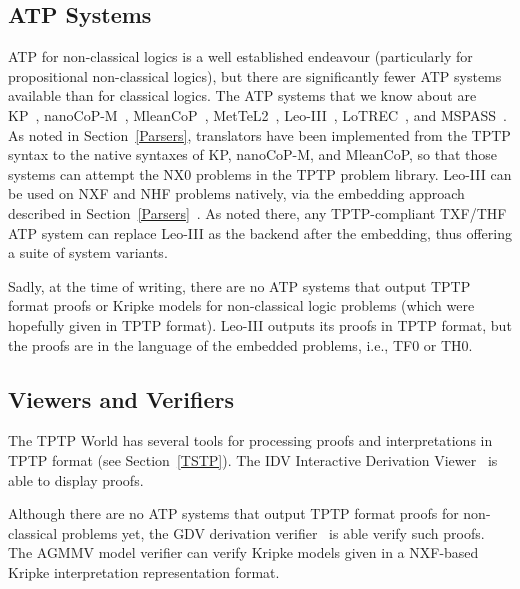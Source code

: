 \documentclass{ceurart}
\begin{document}
\subsection{ATP Systems}
\label{ATPSystems}

ATP for non-classical logics is a well established endeavour (particularly for propositional
non-classical logics), but there are significantly fewer ATP systems available than for classical 
logics.
The ATP systems that we know about are K\raisebox{-3pt}{S}P~\cite{NHD20,PN+21}, 
nanoCoP-M~\cite{Ott21}, MleanCoP~\cite{Ott14}, MetTeL2~\cite{TSK12}, Leo-III~\cite{SB21}, 
LoTREC~\cite{FF+01}, and MSPASS~\cite{HS00-TABLEAUX}.
As noted in Section~\ref{Parsers}, translators have been implemented from the TPTP syntax to the 
native syntaxes of K\raisebox{-3pt}{S}P, nanoCoP-M, and MleanCoP, so that those systems can
attempt the NX0 problems in the TPTP problem library.
Leo-III can be used on NXF and NHF problems natively, via the embedding approach described 
in Section~\ref{Parsers}~\cite{SS+23}.
As noted there, any TPTP-compliant TXF/THF ATP system can replace Leo-III as the backend after
the embedding, thus offering a suite of system variants.

Sadly, at the time of writing, there are no ATP systems that output TPTP format proofs or 
Kripke models for non-classical logic problems (which were hopefully given in TPTP format).
Leo-III outputs its proofs in TPTP format, but the proofs are in the language of the embedded 
problems, i.e., TF0 or TH0.

\subsection{Viewers and Verifiers}
\label{Verifiers}

The TPTP World has several tools for processing proofs and interpretations in TPTP format
(see Section~\ref{TSTP}).
The IDV Interactive Derivation Viewer~\cite{TPS07} is able to display proofs.

Although there are no ATP systems that output TPTP format proofs for non-classical problems yet, the
GDV derivation verifier~\cite{Sut06} is able verify such proofs.
The AGMMV model verifier can verify Kripke models given in a NXF-based Kripke interpretation
representation format.

\end{document}
